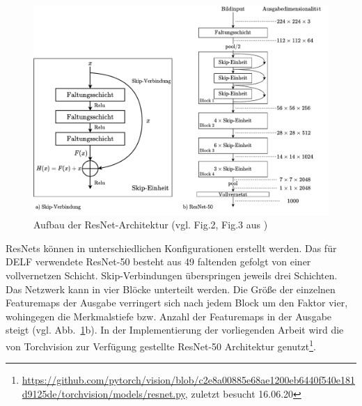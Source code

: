 \begin{figure}[h]
\includegraphics[scale=0.70]{resnet-50.pdf}
\caption{Aufbau der ResNet-Architektur (vgl. Fig.2, Fig.3 aus \cite{resnet})}
\label{resnet}
\end{figure}
ResNets können in unterschiedlichen Konfigurationen erstellt werden. Das für DELF verwendete \mbox{ResNet-50} besteht aus 49 faltenden gefolgt von einer vollvernetzen Schicht. Skip-Verbindungen überspringen jeweils drei Schichten. Das Netzwerk kann in vier Blöcke unterteilt werden. Die Größe der einzelnen Featuremaps der Ausgabe verringert sich nach jedem Block um den Faktor vier, wohingegen die Merkmalstiefe bzw. Anzahl der Featuremaps in der Ausgabe steigt (vgl. Abb.~\ref{resnet}b). In der Implementierung der vorliegenden Arbeit wird die von Torchvision zur Verfügung gestellte ResNet-50 Architektur genutzt\footnote{\url{https://github.com/pytorch/vision/blob/c2e8a00885e68ae1200eb6440f540e181d9125de/torchvision/models/resnet.py}, zuletzt besucht 16.06.20}. 


